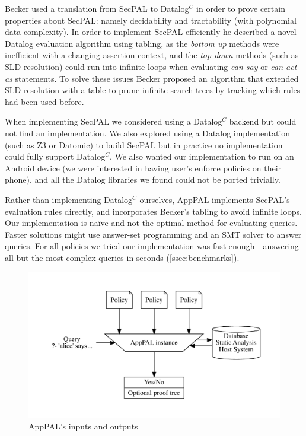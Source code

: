 \documentclass[thesis.tex]{subfiles}
\begin{document}
Becker used a translation from SecPAL to Datalog$^C$ in order to prove certain
properties about SecPAL: namely decidability and tractability (with polynomial
data complexity). In order to implement SecPAL efficiently he described a novel
Datalog evaluation algorithm using tabling, as the \emph{bottom up} methods were
inefficient with a changing assertion context, and the \emph{top down} methods
(such as SLD resolution) could run into infinite loops when evaluating
\emph{can-say} or \emph{can-act-as} statements. To solve these issues Becker
proposed an algorithm that extended SLD resolution with a table to prune
infinite search trees by tracking which rules had been used before.

When implementing SecPAL we considered using a Datalog$^C$ backend but could not
find an implementation. We also explored using a Datalog implementation (such as
Z3 or Datomic) to build SecPAL but in practice no implementation could fully
support Datalog$^C$. We also wanted our implementation to run on an Android
device (we were interested in having user's enforce policies on their phone),
and all the Datalog libraries we found could not be ported trivially.

Rather than implementing Datalog$^C$ ourselves, AppPAL implements SecPAL's
evaluation rules directly, and incorporates Becker's tabling to avoid infinite
loops. Our implementation is na\"ive and not the optimal method for evaluating
queries. Faster solutions might use answer-set programming and an SMT solver to
answer queries. For all policies we tried our implementation was fast
enough---answering all but the most complex queries in seconds
(\autoref{ssec:benchmarks}).


\begin{figure}
  \centering
  \includegraphics[width=\linewidth]{figures/apppal-evaluation.pdf}
  \caption{AppPAL's inputs and outputs}
  \label{fig:apppal-inputs-outputs}
\end{figure}
\end{document}
